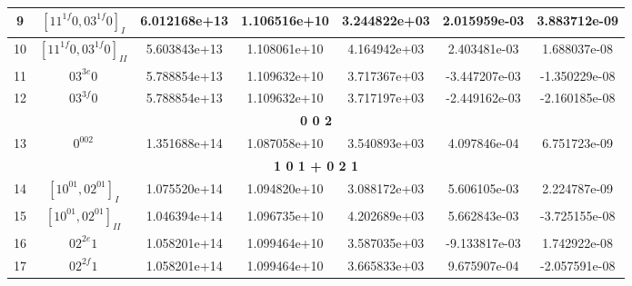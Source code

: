 \begin{table}[h!]
\begin{tabular}{|c|c|c|c|c|c|c|}
9 & $[11^{1f}0, 03^{1f}0]_{I}$ & 6.012168e+13 & 1.106516e+10 & 3.244822e+03 & 2.015959e-03 & 3.883712e-09 \\ \hline
10 & $[11^{1f}0, 03^{1f}0]_{II}$ & 5.603843e+13 & 1.108061e+10 & 4.164942e+03 & 2.403481e-03 & 1.688037e-08 \\ \hline
11 & $03^{3e}0$ & 5.788854e+13 & 1.109632e+10 & 3.717367e+03 & -3.447207e-03 & -1.350229e-08 \\ \hline
12 & $03^{3f}0$ & 5.788854e+13 & 1.109632e+10 & 3.717197e+03 & -2.449162e-03 & -2.160185e-08 \\ \hline
\multicolumn{7}{|c|}{\textbf{0 0 2}} \\ \hline
13 & $0^002$ & 1.351688e+14 & 1.087058e+10 & 3.540893e+03 & 4.097846e-04 & 6.751723e-09 \\ \hline
\multicolumn{7}{|c|}{\textbf{1 0 1 + 0 2 1}} \\ \hline
14 & $[10^01, 02^01]_{I}$ & 1.075520e+14 & 1.094820e+10 & 3.088172e+03 & 5.606105e-03 & 2.224787e-09 \\ \hline
15 & $[10^01, 02^01]_{II}$ & 1.046394e+14 & 1.096735e+10 & 4.202689e+03 & 5.662843e-03 & -3.725155e-08 \\ \hline
16 & $02^{2e}1$ & 1.058201e+14 & 1.099464e+10 & 3.587035e+03 & -9.133817e-03 & 1.742922e-08 \\ \hline
17 & $02^{2f}1$ & 1.058201e+14 & 1.099464e+10 & 3.665833e+03 & 9.675907e-04 & -2.057591e-08 \\ \hline
\end{tabular}
\end{table}


